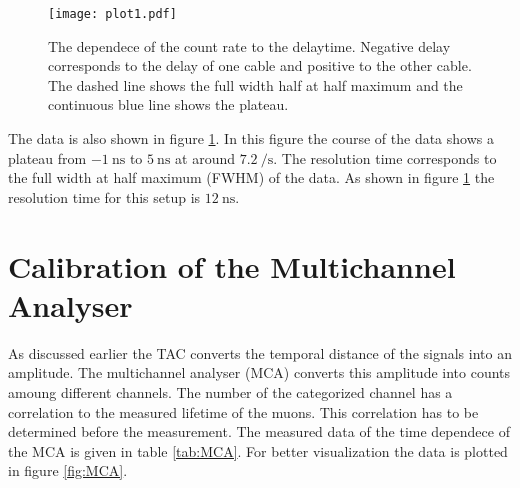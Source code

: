 \begin{figure}
    \centering
    \texttt{[image: plot1.pdf]}
    \caption{The dependece of the count rate to the delaytime. Negative delay corresponds to the delay of one cable and positive to the other cable. The dashed line shows the 
    full width half at half maximum and the continuous blue line shows the plateau.}
    \label{fig:t_d}
\end{figure}

The data is also shown in figure \ref{fig:t_d}. In this figure the course of the data shows a plateau from $\qty{-1}{\nano\second}$ to $\qty{5}{\nano\second}$ at around $\qty{7.2}{\per\second}$.
The resolution time corresponds to the full width at half maximum (FWHM) of the data. As shown in figure \ref{fig:t_d} the resolution time for this setup is $\qty{12}{\nano\second}$.

\section{Calibration of the Multichannel Analyser}
\label{sec:MCA}

As discussed earlier the TAC converts the temporal distance of the signals into an amplitude. The multichannel analyser (MCA) converts this amplitude into counts amoung different 
channels. The number of the categorized channel has a correlation to the measured lifetime of the muons. This correlation has to be determined before the measurement. The measured 
data of the time dependece of the MCA is given in table \ref{tab:MCA}. For better visualization the data is plotted in figure \ref{fig:MCA}. 


